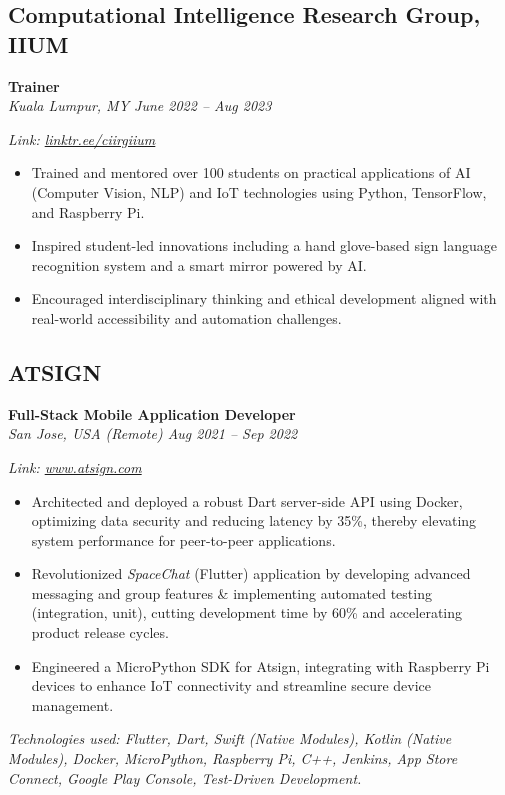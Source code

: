 \documentclass[10pt,letterpaper]{article} %
\newcommand{\jobDetailsLine}[1]{\noindent\textit{#1}\par\vspace{0.5ex}}
\begin{document}
\subsection*{Computational Intelligence Research Group, IIUM}
\noindent\textbf{Trainer} \\
\jobDetailsLine{Kuala Lumpur, MY \textbullet{} June 2022 – Aug 2023}
\textit{Link: \href{https://linktr.ee/ciirgiium}{linktr.ee/ciirgiium}}
\begin{itemize}
    \item Trained and mentored over 100 students on practical applications of AI (Computer Vision, NLP) and IoT technologies using Python, TensorFlow, and Raspberry Pi.
    \item Inspired student-led innovations including a hand glove-based sign language recognition system and a smart mirror powered by AI.
    \item Encouraged interdisciplinary thinking and ethical development aligned with real-world accessibility and automation challenges.
\end{itemize}
\vspace{1ex}

\subsection*{ATSIGN}
\noindent\textbf{Full-Stack Mobile Application Developer} \\
\jobDetailsLine{San Jose, USA (Remote) \textbullet{} Aug 2021 – Sep 2022}
\textit{Link: \href{https://www.atsign.com}{www.atsign.com}}
\begin{itemize}
    \item Architected and deployed a robust Dart server-side API using Docker, optimizing data security and reducing latency by 35\%, thereby elevating system performance for peer-to-peer applications.
    \item Revolutionized \textit{SpaceChat} (Flutter) application by developing advanced messaging and group features & implementing automated testing (integration, unit), cutting development time by 60\% and accelerating product release cycles.
    \item Engineered a MicroPython SDK for Atsign, integrating with Raspberry Pi devices to enhance IoT connectivity and streamline secure device management.
\end{itemize}
\textit{Technologies used: Flutter, Dart, Swift (Native Modules), Kotlin (Native Modules), Docker, MicroPython, Raspberry Pi, C++, Jenkins, App Store Connect, Google Play Console, Test-Driven Development.}
\vspace{1ex}
\end{document}
